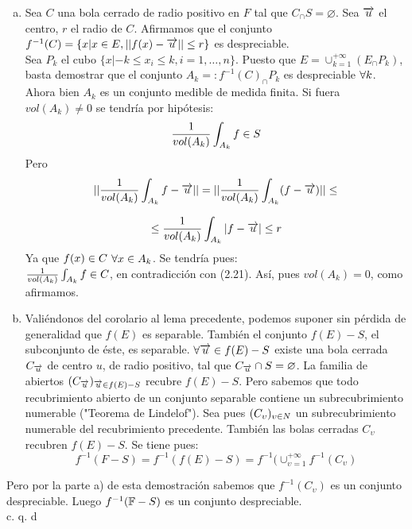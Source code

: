 \begin{enumerate}[a)]
\item Sea $C$ una bola cerrado de radio positivo en $F$ tal que $C_{\cap} S=\varnothing$. Sea $\overrightarrow{u}$ el centro, $r$ el radio de $C$. Afirmamos que el conjunto $f^{-1}(C)= \lbrace x|x \in E, || f(x)- \overrightarrow{u} || \leq r \rbrace$ es despreciable. \\
Sea $P_k$ el cubo $\lbrace x | -k \leq x_i \leq k, i=1, \ldots, n \rbrace$. Puesto que $E= \cup_{k=1}^{+ \infty} (E_{\cap}P_k)$, basta demostrar que el conjunto $A_k =: f^{-1} (C )_{\cap}P_k$ es despreciable $\forall k$. \\
Ahora bien $A_k$ es un conjunto medible de medida finita. Si fuera $vol(A_k) \neq 0$ se tendría por hipótesis:
\begin{equation}
\frac{1}{vol (A_k)}\int_{A_k}f \in S
\end{equation}
Pero 
$$
|| \frac{1}{vol(A_k)}\int_{A_k}f - \overrightarrow{u} ||=||  \frac{1}{vol(A_k)}\int_{A_k}(f-\overrightarrow{u}) || \leq 
$$

$$
\leq  \frac{1}{vol(A_k)}\int_{A_k} | f-\overrightarrow{u} | \leq r
$$
Ya que $f(x) \in C$ $\forall x \in A_k$. Se tendría pues: \\
$ \frac{1}{vol(A_k)}\int_{A_k}f \in C$, en contradicción con (2.21).
Así, pues $vol(A_k)=0$, como afirmamos. 
\item Valiéndonos del corolario al lema precedente, podemos suponer sin pérdida de generalidad que $f(E)$ es separable. También el conjunto $f(E)-S$, el subconjunto de éste, es separable. $\forall \overrightarrow{u} \in f(E)-S$ existe una bola cerrada $C_{\overrightarrow{u}}$ de centro $u$, de radio positivo, tal que $C_{\overrightarrow{u}} \cap S=\varnothing$. La familia de abiertos $(C_{\overrightarrow{u}})_{\overrightarrow{u} \in f(E)-S}$ recubre $f(E)-S$. Pero sabemos que todo recubrimiento abierto de un conjunto separable contiene un subrecubrimiento numerable ("Teorema de Lindelof"). Sea pues $(C_\upsilon)_{\upsilon \in N}$ un subrecubrimiento numerable del recubrimiento precedente. También las bolas cerradas $C_\upsilon$ recubren $f(E)-S$. Se tiene pues:
$$
f^{-1}(F-S)=f^{-1}(f(E)-S)=f^{-1} (\cup_{\upsilon=1}^{+\infty}f^{-1}(C_\upsilon)
$$

\end{enumerate}
 Pero por la parte a) de esta demostración sabemos que $f^{-1}(C_\upsilon)$ es un conjunto despreciable. Luego $f^{-1}(\mathbb{F} -S)$ es un conjunto despreciable. \\
  \phantom{sssssssssssssssssssssssssssssssssss sasdasdasdasdadadssada} c. q. d \\ \\
